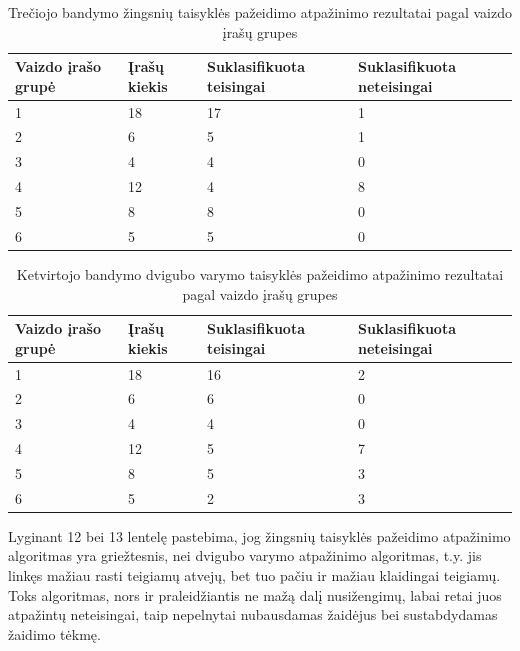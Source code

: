 \documentclass{VUMIFPSbakalaurinis}
\begin{document}
\begin{table}[H]\footnotesize
	\centering
	\caption{Trečiojo bandymo žingsnių taisyklės pažeidimo atpažinimo rezultatai pagal vaizdo įrašų grupes}
	{\begin{tabular}{|p{3cm}|p{3cm}|p{3cm}|p{3cm}|} \hline
			\textbf{Vaizdo įrašo grupė} & \textbf{Įrašų kiekis} & \textbf{Suklasifikuota teisingai} & \textbf{Suklasifikuota neteisingai} \\
			\hline
			1  & 18    & 17    & 1    \\
			\hline
			2  & 6    & 5  & 1     \\
			\hline
			3  & 4    & 4   & 0    \\
			\hline
			4  & 12    & 4  & 8     \\
			\hline
			5  & 8    & 8  & 0     \\
			\hline
			6  & 5    & 5  & 0    \\
			\hline
	\end{tabular}}
	\label{tab:third_trial_recognizion_results_grouped}
\end{table}

\begin{table}[H]\footnotesize
	\centering
	\caption{Ketvirtojo bandymo dvigubo varymo taisyklės pažeidimo atpažinimo rezultatai pagal vaizdo įrašų grupes}
	{\begin{tabular}{|p{3cm}|p{3cm}|p{3cm}|p{3cm}|} \hline
			\textbf{Vaizdo įrašo grupė} & \textbf{Įrašų kiekis} & \textbf{Suklasifikuota teisingai} & \textbf{Suklasifikuota neteisingai} \\
			\hline
			1  & 18    & 16    & 2    \\
			\hline
			2  & 6    & 6  & 0     \\
			\hline
			3  & 4    & 4   & 0    \\
			\hline
			4  & 12    & 5  & 7     \\
			\hline
			5  & 8    & 5  & 3     \\
			\hline
			6  & 5    & 2  & 3     \\
			\hline
	\end{tabular}}
	\label{tab:fourth_trial_recognizion_results_grouped}
\end{table}

Lyginant 12 bei 13 lentelę pastebima, jog žingsnių taisyklės pažeidimo atpažinimo algoritmas yra griežtesnis, nei dvigubo varymo atpažinimo algoritmas, t.y. jis linkęs mažiau rasti teigiamų atvejų, bet tuo pačiu ir mažiau klaidingai teigiamų. Toks algoritmas, nors ir praleidžiantis ne mažą dalį nusižengimų, labai retai juos atpažintų neteisingai, taip nepelnytai nubausdamas žaidėjus bei sustabdydamas žaidimo tėkmę. 
\end{document}
